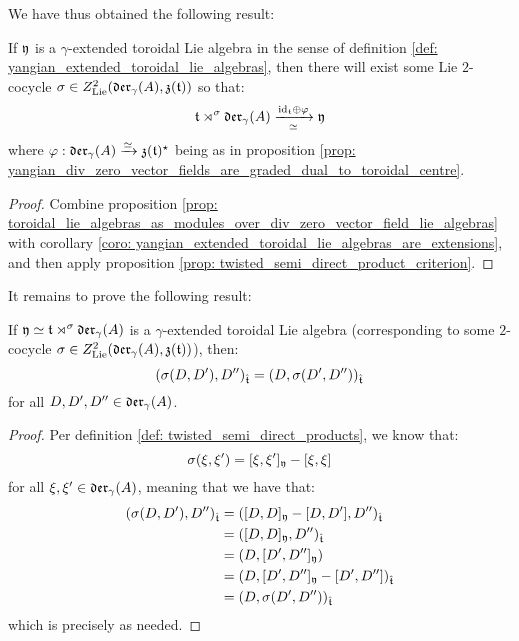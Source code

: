         We have thus obtained the following result:
        \begin{theorem} \label{theorem: yangian_extended_toroidal_lie_algebras}
            If $\mathfrak{y}$ is a $\gamma$-extended toroidal Lie algebra in the sense of definition \ref{def: yangian_extended_toroidal_lie_algebras}, then there will exist some Lie $2$-cocycle $\sigma \in Z^2_{\mathrm{Lie}}(\mathfrak{der}_{\gamma}(A), \mathfrak{z}(\mathfrak{t}))$ so that:
                $$\mathfrak{t} \rtimes^{\sigma} \mathfrak{der}_{\gamma}(A) \xrightarrow[\simeq]{\mathrm{id}_{\mathfrak{t}} \oplus \varphi} \mathfrak{y}$$
            where $\varphi: \mathfrak{der}_{\gamma}(A) \xrightarrow[]{\simeq} \mathfrak{z}(\mathfrak{t})^{\star}$ being as in proposition \ref{prop: yangian_div_zero_vector_fields_are_graded_dual_to_toroidal_centre}.
        \end{theorem}
            \begin{proof}
                Combine proposition \ref{prop: toroidal_lie_algebras_as_modules_over_div_zero_vector_field_lie_algebras} with corollary \ref{coro: yangian_extended_toroidal_lie_algebras_are_extensions}, and then apply proposition \ref{prop: twisted_semi_direct_product_criterion}.
            \end{proof}

        It remains to prove the following result:
        \begin{proposition} \label{prop: yangian_cocycle_invariance}
            If $\mathfrak{y} \simeq \mathfrak{t} \rtimes^{\sigma} \mathfrak{der}_{\gamma}(A)$ is a $\gamma$-extended toroidal Lie algebra (corresponding to some $2$-cocycle $\sigma \in Z^2_{\mathrm{Lie}}(\mathfrak{der}_{\gamma}(A), \mathfrak{z}(\mathfrak{t}))$), then:
                $$(\sigma(D, D'), D'')_{\hat{\mathfrak{t}}} = (D, \sigma(D', D''))_{\hat{\mathfrak{t}}}$$
            for all $D, D', D'' \in \mathfrak{der}_{\gamma}(A)$.
        \end{proposition}
            \begin{proof}
                Per definition \ref{def: twisted_semi_direct_products}, we know that:
                    $$\sigma(\xi, \xi') = [\xi, \xi']_{\mathfrak{y}} - [\xi, \xi]$$
                for all $\xi, \xi' \in \mathfrak{der}_{\gamma}(A)$, meaning that we have that:
                    $$
                        \begin{aligned}
                            (\sigma(D, D'), D'')_{\hat{\mathfrak{t}}} & = ([D, D]_{\mathfrak{y}} - [D, D'], D'')_{\hat{\mathfrak{t}}}
                            \\
                            & = ([D, D]_{\mathfrak{y}}, D'')_{\hat{\mathfrak{t}}} 
                            \\
                            & = (D, [D', D'']_{\mathfrak{y}})
                            \\
                            & = (D, [D', D'']_{\mathfrak{y}} - [D', D''])_{\hat{\mathfrak{t}}}
                            \\
                            & = (D, \sigma(D', D''))_{\hat{\mathfrak{t}}}
                        \end{aligned}
                    $$
                which is precisely as needed.
            \end{proof}

